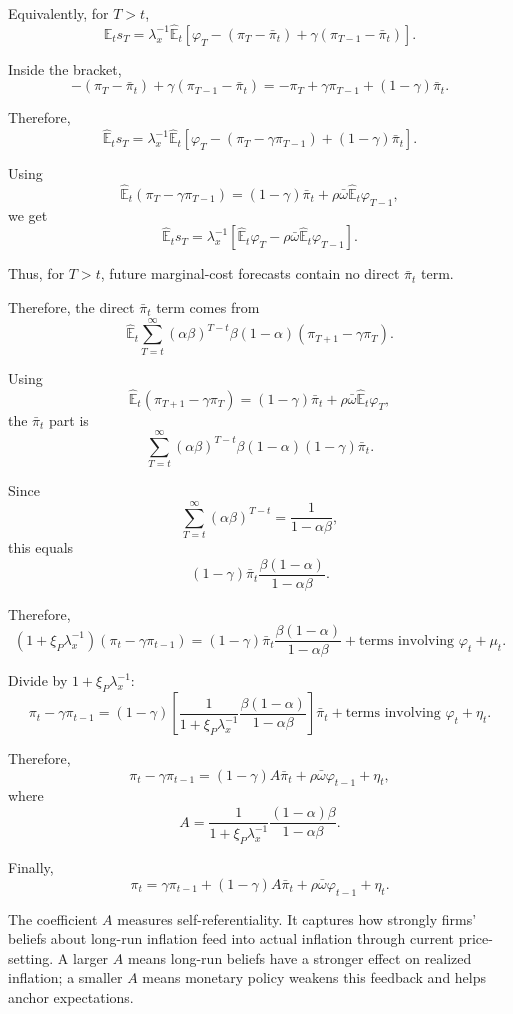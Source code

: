 \documentclass[12pt]{article}
\begin{document}
Equivalently, for $T>t$,
\[
\hat{\mathbb{E}}_{t}s_T
=
\lambda_x^{-1}
\hat{\mathbb{E}}_t
\left[
\varphi_T
-
(\pi_T-\bar{\pi}_t)
+
\gamma(\pi_{T-1}-\bar{\pi}_t)
\right].
\]

Inside the bracket,
\[
-(\pi_T-\bar{\pi}_t)
+
\gamma(\pi_{T-1}-\bar{\pi}_t)
=
-\pi_T+\gamma\pi_{T-1}
+
(1-\gamma)\bar{\pi}_t.
\]

Therefore,
\[
\hat{\mathbb{E}}_{t}s_T
=
\lambda_x^{-1}
\hat{\mathbb{E}}_t
\left[
\varphi_T
-
(\pi_T-\gamma\pi_{T-1})
+
(1-\gamma)\bar{\pi}_t
\right].
\]

Using
\[
\hat{\mathbb{E}}_t(\pi_T-\gamma\pi_{T-1})
=
(1-\gamma)\bar{\pi}_t
+
\rho\bar{\omega}\hat{\mathbb{E}}_t\varphi_{T-1},
\]
we get
\[
\hat{\mathbb{E}}_{t}s_T
=
\lambda_x^{-1}
\left[
\hat{\mathbb{E}}_t\varphi_T
-
\rho\bar{\omega}\hat{\mathbb{E}}_t\varphi_{T-1}
\right].
\]

Thus, for $T>t$, future marginal-cost forecasts contain no direct $\bar{\pi}_t$ term.

Therefore, the direct $\bar{\pi}_t$ term comes from
\[
\hat{\mathbb{E}}_{t}
\sum_{T=t}^{\infty}
(\alpha\beta)^{T-t}
\beta(1-\alpha)(\pi_{T+1}-\gamma\pi_T).
\]

Using
\[
\hat{\mathbb{E}}_t(\pi_{T+1}-\gamma\pi_T)
=
(1-\gamma)\bar{\pi}_t
+
\rho\bar{\omega}\hat{\mathbb{E}}_t\varphi_T,
\]
the $\bar{\pi}_t$ part is
\[
\sum_{T=t}^{\infty}
(\alpha\beta)^{T-t}
\beta(1-\alpha)(1-\gamma)\bar{\pi}_t.
\]

Since
\[
\sum_{T=t}^{\infty}
(\alpha\beta)^{T-t}
=
\frac{1}{1-\alpha\beta},
\]
this equals
\[
(1-\gamma)\bar{\pi}_t
\frac{\beta(1-\alpha)}{1-\alpha\beta}.
\]

Therefore,
\[
(1+\xi_P\lambda_x^{-1})(\pi_t-\gamma\pi_{t-1})
=
(1-\gamma)\bar{\pi}_t
\frac{\beta(1-\alpha)}{1-\alpha\beta}
+
\text{terms involving } \varphi_t
+
\mu_t.
\]

Divide by $1+\xi_P\lambda_x^{-1}$:
\[
\pi_t-\gamma\pi_{t-1}
=
(1-\gamma)
\left[
\frac{1}{1+\xi_P\lambda_x^{-1}}
\frac{\beta(1-\alpha)}{1-\alpha\beta}
\right]\bar{\pi}_t
+
\text{terms involving } \varphi_t
+
\eta_t.
\]

Therefore,
\[
\pi_t-\gamma\pi_{t-1}
=
(1-\gamma)A\bar{\pi}_t
+
\rho\bar{\omega}\varphi_{t-1}
+
\eta_t,
\]
where
\[
\boxed{
A
=
\frac{1}{1+\xi_P\lambda_x^{-1}}
\frac{(1-\alpha)\beta}{1-\alpha\beta}.
}
\]

Finally,
\[
\boxed{
\pi_t
=
\gamma\pi_{t-1}
+
(1-\gamma)A\bar{\pi}_t
+
\rho\bar{\omega}\varphi_{t-1}
+
\eta_t.
}
\]

The coefficient $A$ measures self-referentiality. It captures how strongly firms' beliefs about long-run inflation feed into actual inflation through current price-setting. A larger $A$ means long-run beliefs have a stronger effect on realized inflation; a smaller $A$ means monetary policy weakens this feedback and helps anchor expectations.
\end{document}
